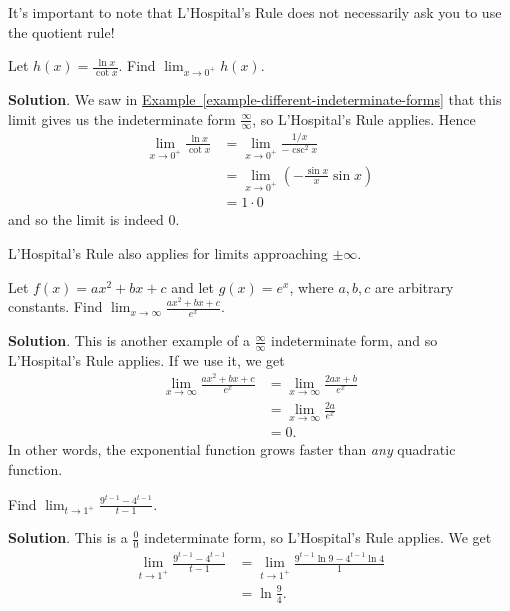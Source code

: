 \documentclass[10pt,]{book}
\theoremstyle{ptxplainnotitle}
\theoremstyle{ptxplaintitle}
\theoremstyle{ptxplainnotitle}
\theoremstyle{ptxplaintitle}
\theoremstyle{ptxplainnotitle}
\theoremstyle{ptxplaintitle}
\theoremstyle{ptxdefinitionnotitle}
\theoremstyle{ptxdefinitiontitle}
\theoremstyle{ptxdefinitionnotitle}
\theoremstyle{ptxdefinitiontitle}
\theoremstyle{ptxdefinitionnotitle}
\theoremstyle{ptxdefinitiontitle}
\theoremstyle{ptxdefinitionnotitle}
\theoremstyle{ptxdefinitiontitle}
\theoremstyle{ptxdefinitionnotitle}
\theoremstyle{ptxdefinitiontitle}
\numberwithin{equation}{section}
\begin{document}
\hypertarget{p-288}{}%
It's important to note that L'Hospital's Rule does not necessarily ask you to use the quotient rule!%
\begin{example}\label{example-using-l-hospital-s-rule}
\hypertarget{p-289}{}%
Let \(h(x) = \frac{\ln x}{\cot x}\). Find \(\lim_{x\to0^{+}}h(x)\).%
\par\smallskip%
\noindent\textbf{Solution}.\hypertarget{solution-63}{}\quad%
\hypertarget{p-290}{}%
We saw in \hyperref[example-different-indeterminate-forms]{Example~\ref{example-different-indeterminate-forms}} that this limit gives us the indeterminate form \(\frac{\infty}{\infty}\), so L'Hospital's Rule applies. Hence%
\begin{align*}
\lim_{x\to0^{+}}\frac{\ln x}{\cot x} & = \lim_{x\to0^{+}}\frac{1/x}{-\csc^{2}x} \\
& = \lim_{x\to0^{+}}\left(-\frac{\sin x}{x}\sin x\right) \\
& = 1\cdot0 
\end{align*}
and so the limit is indeed \(0\).%
\end{example}
\hypertarget{p-291}{}%
L'Hospital's Rule also applies for limits approaching \(\pm\infty\).%
\begin{example}\label{example-exponential-and-polynomial-growth}
\hypertarget{p-292}{}%
Let \(f(x) = ax^{2} + bx + c\) and let \(g(x) = e^{x}\), where \(a,b,c\) are arbitrary constants. Find \(\lim_{x\to\infty}\frac{ax^{2} + bx + c}{e^{x}}\).%
\par\smallskip%
\noindent\textbf{Solution}.\hypertarget{solution-64}{}\quad%
\hypertarget{p-293}{}%
This is another example of a \(\frac{\infty}{\infty}\) indeterminate form, and so L'Hospital's Rule applies. If we use it, we get%
\begin{align*}
\lim_{x\to\infty}\frac{ax^{2} + bx + c}{e^{x}} & = \lim_{x\to\infty}\frac{2ax+b}{e^{x}} \\
& = \lim_{x\to\infty}\frac{2a}{e^{x}} \\
& = 0. 
\end{align*}
In other words, the exponential function grows faster than \emph{any} quadratic function.%
\end{example}
\begin{example}\label{example-another-limit-involving-exponentials}
\hypertarget{p-294}{}%
Find \(\lim_{t\to1^{+}}\frac{9^{t-1} - 4^{t-1}}{t-1}\).%
\par\smallskip%
\noindent\textbf{Solution}.\hypertarget{solution-65}{}\quad%
\hypertarget{p-295}{}%
This is a \(\frac{0}{0}\) indeterminate form, so L'Hospital's Rule applies. We get%
\begin{align*}
\lim_{t\to1^{+}}\frac{9^{t-1} - 4^{t-1}}{t-1} & = \lim_{t\to1^{+}}\frac{9^{t-1}\ln9 - 4^{t-1}\ln4}{1} \\
& = \ln\frac{9}{4}. 
\end{align*}
%
\end{example}
\end{document}
